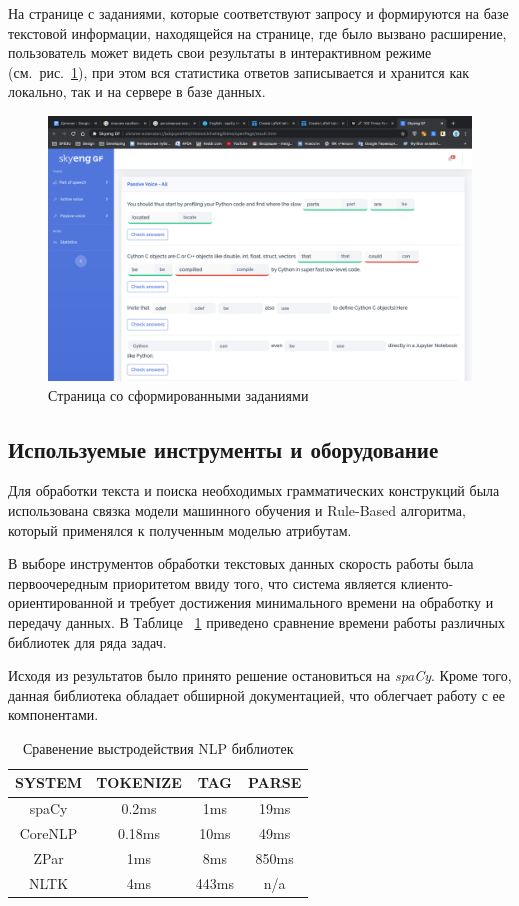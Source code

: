 На странице с заданиями, которые соответствуют запросу и  формируются на базе текстовой информации, находящейся на странице, где было вызвано расширение, пользователь может видеть свои результаты в интерактивном режиме (см.~рис.~\ref{fig:tasks-example}), при этом вся статистика ответов записывается и хранится как локально, так и на сервере в базе данных.
\begin{figure}[p]
\centering
\includegraphics[width=\textwidth]{img/tasks-example}
\caption{\label{fig:tasks-example}Страница со сформированными заданиями}
\end{figure}


\newpage

\subsection{Используемые инструменты и оборудование}
Для обработки текста и поиска необходимых грамматических конструкций была использована связка модели машинного обучения и Rule-Based алгоритма, который применялся к полученным моделью атрибутам.

В выборе инструментов обработки текстовых данных скорость работы была первоочередным приоритетом ввиду того, что система является клиенто-ориентированной и требует достижения минимального времени на обработку и передачу данных. В Таблице ~\ref{tab:nlp-speed} приведено сравнение времени работы различных библиотек для ряда задач.

Исходя из результатов было принято решение остановиться на \emph{spaCy}. Кроме того, данная библиотека обладает обширной документацией, что облегчает работу с ее компонентами.

\begin{table}
\centering
\caption{\label{tab:nlp-speed}Сравенение выстродействия NLP библиотек}
\begin{tabular}{@{}cccc@{}}
\toprule
SYSTEM  & TOKENIZE & TAG   & PARSE \\ \midrule
spaCy   & 0.2ms    & 1ms   & 19ms  \\
CoreNLP & 0.18ms   & 10ms  & 49ms  \\
ZPar    & 1ms      & 8ms   & 850ms \\
NLTK    & 4ms      & 443ms & n/a   \\ \bottomrule
\end{tabular}
\end{table}

